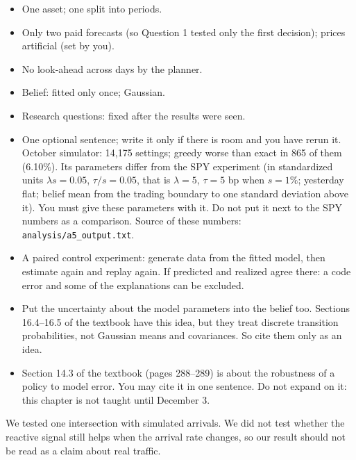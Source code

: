 \documentclass{article}
\newenvironment{pts}{\begin{itemize}[nosep,leftmargin=1.15em,topsep=1pt]}{\end{itemize}}
\begin{document}
\begin{note}
\begin{pts}
\item One asset; one split into periods.
\item Only two paid forecasts (so Question 1 tested only the first decision); prices artificial (set by you).
\item No look-ahead across days by the planner.
\item Belief: fitted only once; Gaussian.
\item Research questions: fixed after the results were seen.
\item One optional sentence; write it only if there is room and you have rerun it. October simulator: 14{,}175 settings; greedy worse than exact in 865 of them (6.10\%). Its parameters differ from the SPY experiment (in standardized units $\lambda s = 0.05$, $\tau/s = 0.05$, that is $\lambda=5$, $\tau=5$ bp when $s=1\%$; yesterday flat; belief mean from the trading boundary to one standard deviation above it). You must give these parameters with it. Do not put it next to the SPY numbers as a comparison. Source of these numbers: \texttt{analysis/a5\_output.txt}.
\end{pts}
\end{note}

\begin{note}
\begin{pts}
\item A paired control experiment: generate data from the fitted model, then estimate again and replay again. If predicted and realized agree there: a code error and some of the explanations can be excluded.
\item Put the uncertainty about the model parameters into the belief too. Sections 16.4--16.5 of the textbook have this idea, but they treat discrete transition probabilities, not Gaussian means and covariances. So cite them only as an idea.
\item Section 14.3 of the textbook (pages 288--289) is about the robustness of a policy to model error. You may cite it in one sentence. Do not expand on it: this chapter is not taught until December 3.
\end{pts}
\end{note}

\begin{model}
We tested one intersection with simulated arrivals. We did not test whether the reactive signal still helps when the arrival rate changes, so our result should not be read as a claim about real traffic.
\end{model}
\end{document}
